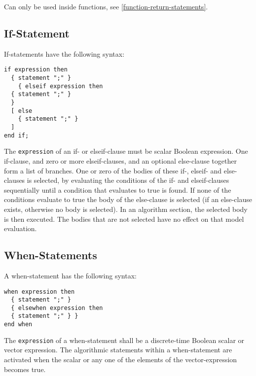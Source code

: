 Can only be used inside functions, see \autoref{function-return-statements}.

\subsection{If-Statement}

If-statements have the following syntax:

\begin{lstlisting}[language=grammar]
if expression then
  { statement ";" }
    { elseif expression then
  { statement ";" }
  }
  [ else
    { statement ";" }
  ]
end if;
\end{lstlisting}

The \lstinline!expression! of an if- or elseif-clause must be scalar Boolean
expression. One if-clause, and zero or more elseif-clauses, and an
optional else-clause together form a list of branches. One or zero of
the bodies of these if-, elseif- and else-clauses is selected, by
evaluating the conditions of the if- and elseif-clauses sequentially
until a condition that evaluates to true is found. If none of the
conditions evaluate to true the body of the else-clause is selected (if
an else-clause exists, otherwise no body is selected). In an algorithm
section, the selected body is then executed. The bodies that are not
selected have no effect on that model evaluation.

\subsection{When-Statements}

A when-statement has the following syntax:

\begin{lstlisting}[language=grammar]
when expression then
  { statement ";" }
  { elsewhen expression then
  { statement ";" } }
end when
\end{lstlisting}
The \lstinline!expression! of a when-statement shall be a discrete-time Boolean
scalar or vector expression. The algorithmic statements within a
when-statement are activated when the scalar or any one of the elements
of the vector-expression becomes true.

